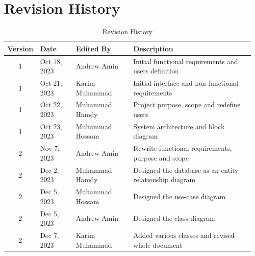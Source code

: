 \documentclass{BusMateSRS}
\def\nameAndrew{Andrew Amin}
\def\nameKarim{Karim Muhammad}
\def\nameHamdy{Muhammad Hamdy}
\def\nameHossam{Muhammad Hossam}
\begin{document}
\maketitle
\tableofcontents
\listoffigures
\listoftables

\chapter*{Revision History}
\begin{table}[h!]
	\centering
	\begin{tabularx}{\textwidth}{|c|l|l|X|}
		\hline
		\textbf{Version} & \textbf{Date} & \textbf{Edited By} & \textbf{Description} \\
		\hline
		1                & Oct 18, 2023  & \nameAndrew        &
		Initial functional requirements and users definition                         \\
		\hline
		1                & Oct 21, 2023  & \nameKarim         &
		Initial interface and non-functional requirements                            \\
		\hline
		1                & Oct 22, 2023  & \nameHamdy         &
		Project purpose, scope and redefine users                                    \\
		\hline
		1                & Oct 23, 2023  & \nameHossam        &
		System architecture and block diagram                                        \\
		\hline
		2                & Nov 7, 2023   & \nameAndrew        &
		Rewrite functional requirements, purpose and scope                           \\
		\hline
		2                & Dec 2, 2023   & \nameHamdy         &
		Designed the database as an entity relationship diagram                      \\
		\hline
		2                & Dec 5, 2023   & \nameHossam        &
		Designed the use-case diagram                                                \\
		\hline
		2                & Dec 5, 2023   & \nameAndrew        &
		Designed the class diagram                                                   \\
		\hline
		2                & Dec 7, 2023   & \nameKarim         &
		Added various classes and revised whole document                             \\
		\hline
	\end{tabularx}
	\caption{Revision History}
	\label{tab:revision-history}
\end{table}
\end{document}
